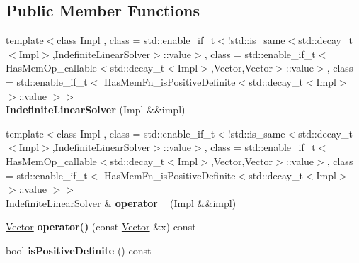 \subsection*{Public Member Functions}
\begin{DoxyCompactItemize}
\item 
\hypertarget{classSpacy_1_1IndefiniteLinearSolver_ac19f92a58a8b4bfec32c58c1e4842880}{}{\footnotesize template$<$class Impl , class  = std\+::enable\+\_\+if\+\_\+t$<$!std\+::is\+\_\+same$<$std\+::decay\+\_\+t$<$\+Impl$>$,\+Indefinite\+Linear\+Solver$>$\+::value$>$, class  = std\+::enable\+\_\+if\+\_\+t$<$\+Has\+Mem\+Op\+\_\+callable$<$std\+::decay\+\_\+t$<$\+Impl$>$,\+Vector,\+Vector$>$\+::value$>$, class  = std\+::enable\+\_\+if\+\_\+t$<$ Has\+Mem\+Fn\+\_\+is\+Positive\+Definite$<$std\+::decay\+\_\+t$<$\+Impl$>$ $>$\+::value $>$$>$ }\\{\bfseries Indefinite\+Linear\+Solver} (Impl \&\&impl)\label{classSpacy_1_1IndefiniteLinearSolver_ac19f92a58a8b4bfec32c58c1e4842880}

\item 
\hypertarget{classSpacy_1_1IndefiniteLinearSolver_a091ae5c4dcfa22441fe504d03a0c6130}{}{\footnotesize template$<$class Impl , class  = std\+::enable\+\_\+if\+\_\+t$<$!std\+::is\+\_\+same$<$std\+::decay\+\_\+t$<$\+Impl$>$,\+Indefinite\+Linear\+Solver$>$\+::value$>$, class  = std\+::enable\+\_\+if\+\_\+t$<$\+Has\+Mem\+Op\+\_\+callable$<$std\+::decay\+\_\+t$<$\+Impl$>$,\+Vector,\+Vector$>$\+::value$>$, class  = std\+::enable\+\_\+if\+\_\+t$<$ Has\+Mem\+Fn\+\_\+is\+Positive\+Definite$<$std\+::decay\+\_\+t$<$\+Impl$>$ $>$\+::value $>$$>$ }\\\hyperlink{classSpacy_1_1IndefiniteLinearSolver}{Indefinite\+Linear\+Solver} \& {\bfseries operator=} (Impl \&\&impl)\label{classSpacy_1_1IndefiniteLinearSolver_a091ae5c4dcfa22441fe504d03a0c6130}

\item 
\hypertarget{classSpacy_1_1IndefiniteLinearSolver_a150a854c97a44c1c53c4aa071e1b8b12}{}\hyperlink{classSpacy_1_1Vector}{Vector} {\bfseries operator()} (const \hyperlink{classSpacy_1_1Vector}{Vector} \&x) const \label{classSpacy_1_1IndefiniteLinearSolver_a150a854c97a44c1c53c4aa071e1b8b12}

\item 
\hypertarget{classSpacy_1_1IndefiniteLinearSolver_a04191e6ed2c8cd54870c79a919dcae39}{}bool {\bfseries is\+Positive\+Definite} () const \label{classSpacy_1_1IndefiniteLinearSolver_a04191e6ed2c8cd54870c79a919dcae39}


\end{DoxyCompactItemize}
